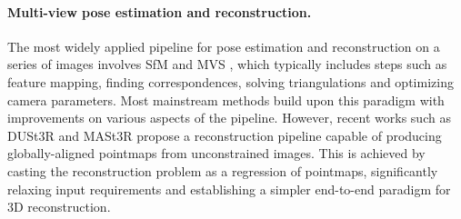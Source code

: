 \paragraph{Multi-view pose estimation and reconstruction.}
 The most widely applied pipeline for pose estimation and reconstruction on a series of images involves SfM \citep{schoenberger2016sfm} and MVS \citep{schoenberger2016mvs}, which typically includes steps such as feature mapping, finding correspondences, solving triangulations and optimizing camera parameters. Most mainstream methods build upon this paradigm with improvements on various aspects of the pipeline. However, recent works such as DUSt3R \citep{wang2024dust3r} and MASt3R \citep{leroy2024grounding} propose a reconstruction pipeline capable of producing globally-aligned pointmaps from unconstrained images. This is achieved by casting the reconstruction problem as a regression of pointmaps, significantly relaxing input requirements and establishing a simpler end-to-end paradigm for 3D reconstruction.